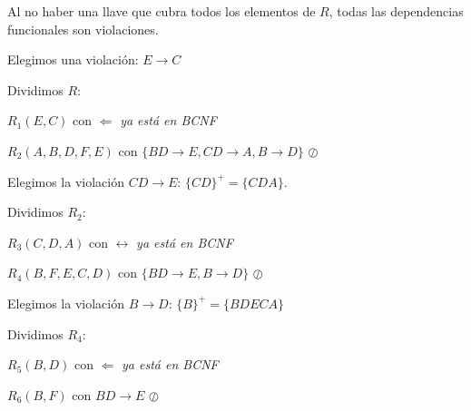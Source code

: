 \documentclass[12pt, letterpaper]{article}
\begin{document}
\begin{itemize}
\begin{itemize}
\begin{itemize}
                                                      Al no haber una llave que cubra todos los elementos de $R$, todas las dependencias funcionales son violaciones.\vspace{.3cm}

                                                      Elegimos una violación: $E\rightarrow C$\vspace{.3cm}

                                                      Dividimos $R$:\vspace{.2cm}

                                                      $R_{1}(E,C)$ con  \checkmark $\Leftarrow$ \textit{ya está en BCNF}\vspace{.1cm}

                                                      $R_{2}(A,B,D,F,E)$ con $\{BD\rightarrow E, CD \rightarrow A, B\rightarrow D\}$ $\oslash$\vspace{.3cm}

                                                      Elegimos la violación $CD \rightarrow E$: $\{CD\}^+=\{CDA\}$.\vspace{.2cm}

                                                      Dividimos $R_{2}$:\vspace{.1cm}

                                                      $R_{3}(C,D,A)$ con  \checkmark $\leftrightarrow$ \textit{ya está en BCNF}\vspace{.1cm}

                                                      $R_{4}(B,F,E,C,D)$ con $\{BD \rightarrow E, B \rightarrow D\}$ $\oslash$ \vspace{.3cm}

                                                      Elegimos la violación $B\rightarrow D$: $\{B\}^+=\{BDECA\}$\vspace{.2cm}

                                                      Dividimos $R_{4}$:\vspace{.1cm}

                                                      $R_{5}(B,D)$ con  \checkmark $\Leftarrow$ \textit{ya está en BCNF}\vspace{.1cm}

                                                      $R_{6}(B,F)$ con $BD \rightarrow E$ $\oslash$\vspace{.3cm}


\end{itemize}
\end{itemize}
\end{itemize}
\end{document}
